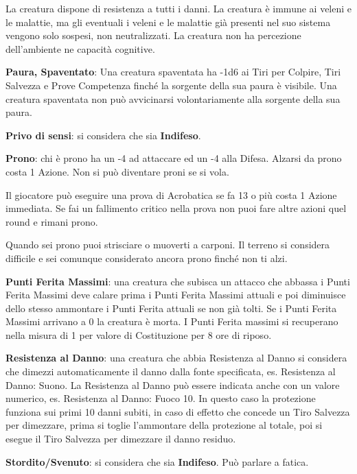 \begin{multicols}{2}
La creatura dispone di resistenza a tutti i danni. La creatura è immune ai veleni e le malattie, ma gli eventuali i veleni e le malattie già presenti nel suo sistema vengono solo sospesi, non neutralizzati. La creatura non ha percezione dell'ambiente ne capacità cognitive.

\textbf{Paura, Spaventato}:\hypertarget{condizionepaura}{}
Una creatura spaventata ha -1d6 ai Tiri per Colpire, Tiri Salvezza e Prove Competenza finché la sorgente della sua paura è visibile. Una creatura spaventata non può avvicinarsi volontariamente alla sorgente della sua paura.

\textbf{Privo di sensi}: si considera che sia \textbf{Indifeso}.

\textbf{Prono}: chi è prono ha un -4 ad attaccare ed un -4 alla Difesa. Alzarsi da prono costa 1 Azione. Non si può diventare proni se si vola.

Il giocatore può eseguire una prova di Acrobatica se fa 13 o più costa 1 Azione immediata. Se fai un fallimento critico nella prova non puoi fare altre azioni quel round e rimani prono.

Quando sei prono puoi strisciare o muoverti a carponi. Il terreno si considera difficile e sei comunque considerato ancora prono finché non ti alzi.

\textbf{Punti Ferita Massimi}: una creatura che subisca un attacco che abbassa i Punti Ferita Massimi deve calare prima i Punti Ferita Massimi attuali e poi diminuisce dello stesso ammontare i Punti Ferita attuali se non già tolti. Se i Punti Ferita Massimi arrivano a 0 la creatura è morta. I Punti Ferita massimi si recuperano nella misura di 1 per valore di Costituzione per 8 ore di riposo.

\textbf{Resistenza al Danno}: una creatura che abbia Resistenza al Danno si considera che dimezzi automaticamente il danno dalla fonte specificata, es. Resistenza al Danno: Suono. La Resistenza al Danno può essere indicata anche con un valore numerico, es. Resistenza al Danno: Fuoco 10. In questo caso la protezione funziona sui primi 10 danni subiti, in caso di effetto che concede un Tiro Salvezza per dimezzare, prima si toglie l'ammontare della protezione al totale, poi si esegue il Tiro Salvezza per dimezzare il danno residuo.

\textbf{Stordito/Svenuto}: si considera che sia \textbf{Indifeso}. Può parlare a fatica.


\end{multicols}
